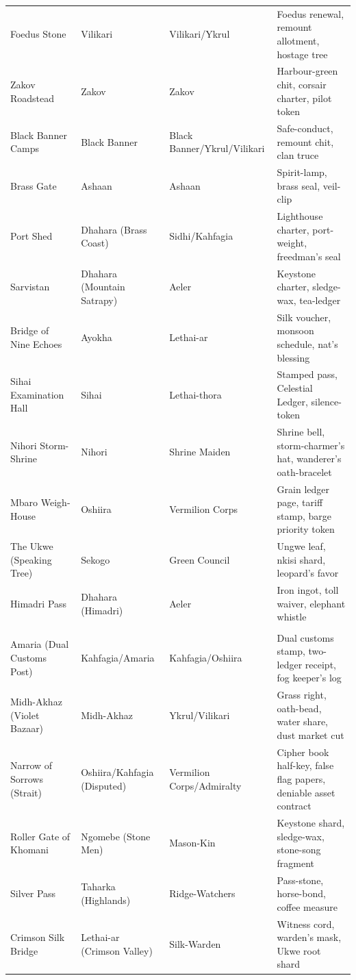 \documentclass[11pt,letterpaper,twoside]{book}
\begin{document}
\begin{longtable}{llll}
Foedus Stone & Vilikari & Vilikari/Ykrul & Foedus renewal, remount allotment, hostage tree \\
Zakov Roadstead & Zakov & Zakov & Harbour-green chit, corsair charter, pilot token \\
Black Banner Camps & Black Banner & Black Banner/Ykrul/Vilikari & Safe-conduct, remount chit, clan truce \\
Brass Gate & Ashaan & Ashaan & Spirit-lamp, brass seal, veil-clip \\
Port Shed & Dhahara (Brass Coast) & Sidhi/Kahfagia & Lighthouse charter, port-weight, freedman's seal \\
Sarvistan & Dhahara (Mountain Satrapy) & Aeler & Keystone charter, sledge-wax, tea-ledger \\
Bridge of Nine Echoes & Ayokha & Lethai-ar & Silk voucher, monsoon schedule, nat's blessing \\
Sihai Examination Hall & Sihai & Lethai-thora & Stamped pass, Celestial Ledger, silence-token \\
Nihori Storm-Shrine & Nihori & Shrine Maiden & Shrine bell, storm-charmer's hat, wanderer's oath-bracelet \\
Mbaro Weigh-House & Oshiira & Vermilion Corps & Grain ledger page, tariff stamp, barge priority token \\
The Ukwe (Speaking Tree) & Sekogo & Green Council & Ungwe leaf, nkisi shard, leopard's favor \\
Himadri Pass & Dhahara (Himadri) & Aeler & Iron ingot, toll waiver, elephant whistle \\
\addlinespace
\multicolumn{4}{c}{\textbf{--- Added Gateways ---}} \\
\midrule
Amaria (Dual Customs Post) & Kahfagia/Amaria & Kahfagia/Oshiira & Dual customs stamp, two-ledger receipt, fog keeper's log \\
Midh-Akhaz (Violet Bazaar) & Midh-Akhaz & Ykrul/Vilikari & Grass right, oath-bead, water share, dust market cut \\
Narrow of Sorrows (Strait) & Oshiira/Kahfagia (Disputed) & Vermilion Corps/Admiralty & Cipher book half-key, false flag papers, deniable asset contract \\
\addlinespace
Roller Gate of Khomani & Ngomebe (Stone Men) & Mason-Kin & Keystone shard, sledge-wax, stone-song fragment \\
Silver Pass & Taharka (Highlands) & Ridge-Watchers & Pass-stone, horse-bond, coffee measure \\
Crimson Silk Bridge & Lethai-ar (Crimson Valley) & Silk-Warden & Witness cord, warden's mask, Ukwe root shard \\

\end{longtable}
\end{document}

